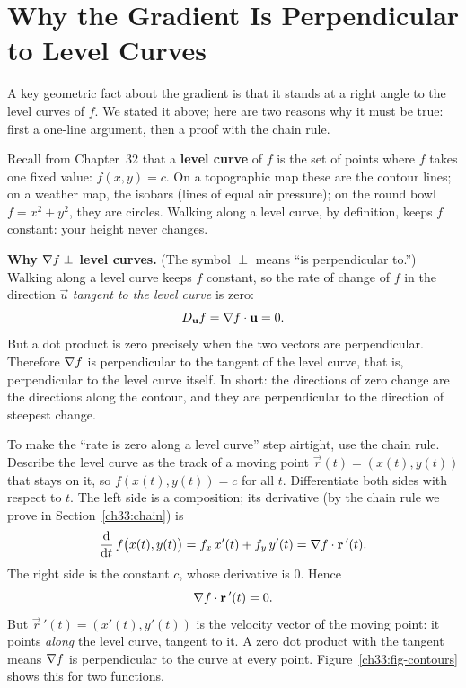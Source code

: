 \section{Why the Gradient Is Perpendicular to Level Curves}
\label{ch33:perp}

A key geometric fact about the gradient is that it stands at a right angle to the
level curves of $f$. We stated it above; here are two reasons why it must be true:
first a one-line argument, then a proof with the chain rule.

Recall from Chapter~32 that a \textbf{level curve} of $f$ is the set of points where $f$ takes one fixed
value: $f(x,y)=c$. On a topographic map these are the contour lines; on a weather
map, the isobars (lines of equal air pressure); on the round bowl $f=x^2+y^2$, they are circles. Walking along a
level curve, by definition, keeps $f$ constant: your height never changes.

\begin{whybox}
\textbf{Why $\nabla f \perp$ level curves.} (The symbol $\perp$ means ``is
perpendicular to.'') Walking along a level curve keeps $f$
constant, so the rate of change of $f$ in the direction $\vec u$ \emph{tangent to
the level curve} is zero:
\[
  D_{\mathbf{u}} f = \nabla f \cdot \mathbf{u} = 0.
\]
But a dot product is zero precisely when the two vectors are perpendicular.
Therefore $\nabla f$ is perpendicular to the tangent of the level curve, that is,
perpendicular to the level curve itself. In short: the directions of zero change
are the directions along the contour, and they are perpendicular to the direction
of steepest change.
\end{whybox}

To make the ``rate is zero along a level curve'' step airtight, use the chain
rule. Describe the level curve as the track of a moving point
$\vec r(t)=(x(t),y(t))$ that stays on it, so $f(x(t),y(t))=c$ for all $t$.
Differentiate both sides with respect to $t$. The left side is a composition;
its derivative (by the chain rule we prove in Section~\ref{ch33:chain}) is
\[
  \frac{\mathrm{d} }{\mathrm{d} t}\,f\big(x(t),y(t)\big) = f_x\,x'(t) + f_y\,y'(t)
  = \nabla f \cdot \mathbf{r}\,'(t).
\]
The right side is the constant $c$, whose derivative is $0$. Hence
\[
  \nabla f \cdot \mathbf{r}\,'(t) = 0.
\]
But $\vec r\,'(t)=(x'(t),y'(t))$ is the velocity vector of the moving point: it
points \emph{along} the level curve, tangent to it. A zero dot product with the
tangent means $\nabla f$ is perpendicular to the curve at every point.
Figure~\ref{ch33:fig-contours} shows this for two functions.

